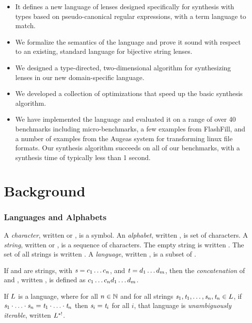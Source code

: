 \documentclass[numbers]{sigplanconf}
\begin{document}
\begin{itemize}
\item It defines a new language of lenses designed specifically for synthesis
  with types based on pseudo-canonical regular expressions, with a term 
  language to match.
\item We formalize the semantics of the language and prove it sound with
  respect to an existing, standard language for bijective string lenses.
\item We designed a type-directed, two-dimensional 
  algorithm for synthesizing lenses in our new domain-specific language.
\item We developed a collection of optimizations that speed up the basic
  synthesis algorithm.
\item We have implemented the language and evaluated it on a range of
  over 40 benchmarks including micro-benchmarks, a few examples from FlashFill,
  and a number of examples from the Augeas system for transforming linux
  file formats.  Our synthesis algorithm succeeds on all of our
  benchmarks, with a synthesis time of typically less than 1 second.
\end{itemize}

\section{Background}

\subsubsection{Languages and Alphabets}

A \textit{character}, written \Character{} or \CharacterAlt{}, is a symbol.
An \textit{alphabet}, written \Alphabet{}, is set of characters.
A \textit{string}, written \String{} or \StringAlt{}, is a sequence of characters.
The empty string is written \EmptyString{}.
The set of all strings is written \StarOf{\Alphabet}.
A \textit{language}, written \Language{}, is a subset of \StarOf{\Alphabet}.

If \String{} and \StringAlt{} are strings, with
$\mathit{s}=c_1\ldots c_n$,
and $\mathit{t}=d_1\ldots d_m$,
then the \textit{concatenation} of \String{} and \StringAlt{},
written \String{}\Concat\StringAlt{}, is defined as
$c_1\ldots c_nd_1\ldots d_m$.

If $L$ is a language, where
for all $n\in\mathbb{N}$ and for all strings
$\mathit{s}_1,\mathit{t}_1,\ldots,\mathit{s}_n,\mathit{t}_n\in L$, if
$\mathit{s}_1\cdot\ldots\cdot\mathit{s}_n=\mathit{t}_1\cdot\ldots\cdot\mathit{t}_n$
then $\mathit{s}_i=\mathit{t}_i$ for all $i$,
that language is \textit{unambiguously iterable},
written $L^{*!}$.
\end{document}
